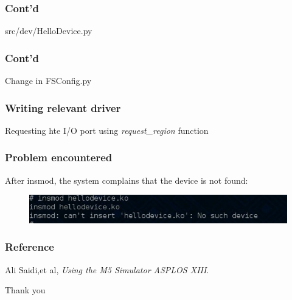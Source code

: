 \documentclass{beamer}
\begin{document}
\begin{frame}
    \frametitle{Cont'd}
    \begin{block}{src/dev/HelloDevice.py}
	
    \end{block}
\end{frame}

\begin{frame}
    \frametitle{Cont'd}
    \begin{block}{Change in FSConfig.py}
	
    \end{block}
\end{frame}

\begin{frame}
    \frametitle{Writing relevant driver}
    Requesting hte I/O port using {\it request\_region} function
    \begin{block}{}
	
    \end{block}
\end{frame}

\begin{frame}
    \frametitle{Problem encountered}
    After insmod, the system complains that the device is not found:
    \begin{figure}[H]
	\begin{center}
	    \includegraphics[width=.8\textwidth]{m10.jpg}
	\end{center}
    \end{figure}
\end{frame}

\begin{frame}
    \frametitle{Reference}
    \begin{thebibliography}{99}
	    Ali Saidi,et al,
	    \emph{Using the M5 Simulator ASPLOS XIII}.
    \end{thebibliography}
\end{frame}
\begin{frame}
\Huge{\centerline{Thank you}}
\end{frame}
\end{document}
